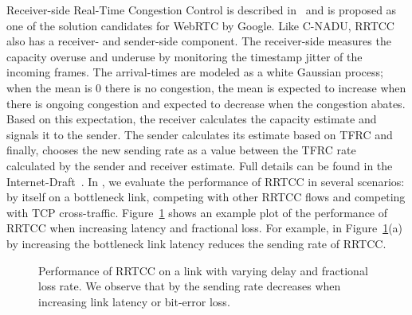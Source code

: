 Receiver-side Real-Time Congestion Control is described in~\cite{draft.rrtcc}
and is proposed as one of the solution candidates for WebRTC by Google. Like
C-NADU, RRTCC also has a receiver- and sender-side component. The
receiver-side measures the capacity overuse and underuse by monitoring the
timestamp jitter of the incoming frames. The arrival-times are modeled as a
white Gaussian process; when the mean is 0 there is no congestion, the mean is
expected to increase when there is ongoing congestion and expected to decrease
when the congestion abates. Based on this expectation, the receiver calculates
the capacity estimate and signals it to the sender. The sender calculates its
estimate based on TFRC and finally, chooses the new sending rate as a value
between the TFRC rate calculated by the sender and receiver estimate. Full
details can be found in the Internet-Draft~\cite{draft.rrtcc}. In
, we evaluate the performance of RRTCC in several scenarios:
by itself on a bottleneck link, competing with other RRTCC flows and competing
with TCP cross-traffic. Figure~\ref{fig:rrtcc} shows an example plot of the
performance of RRTCC when increasing latency and fractional loss. For example,
in Figure~\ref{fig:rrtcc}(a) by increasing the bottleneck link latency reduces
the sending rate of RRTCC.

\begin{figure}
  \centerline{
  }
  \caption{Performance of RRTCC on a link with varying delay and fractional
  loss rate. We observe that by the sending rate decreases when increasing
  link latency or bit-error loss. }
  \label{fig:rrtcc}
\end{figure}

% 

